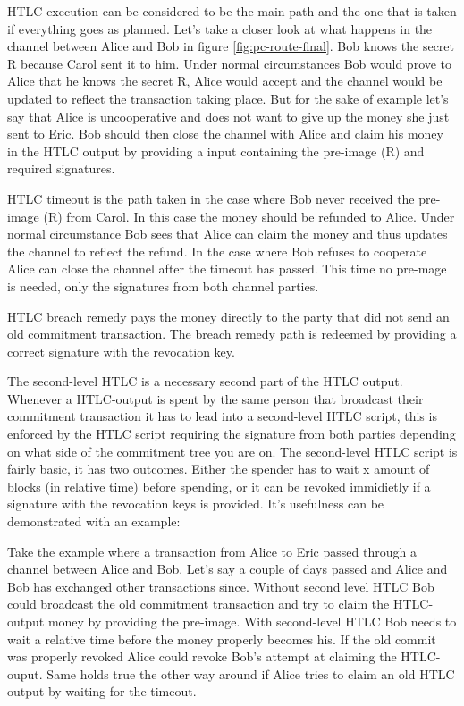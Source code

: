 HTLC execution can be considered to be the main path and the one that is taken if everything goes as planned. Let's take a closer look at what happens in the channel between Alice and Bob in figure \ref{fig:pc-route-final}. Bob knows the secret R because Carol sent it to him. Under normal circumstances Bob would prove to Alice that he knows the secret R, Alice would accept and the channel would be updated to reflect the transaction taking place. But for the sake of example let's say that Alice is uncooperative and does not want to give up the money she just sent to Eric. 
Bob should then close the channel with Alice and claim his money in the HTLC output by providing a input containing the pre-image (R) and required signatures.

HTLC timeout is the path taken in the case where Bob never received the pre-image (R) from Carol. In this case the money should be refunded to Alice. Under normal circumstance Bob sees that Alice can claim the money and thus updates the channel to reflect the refund. In the case where Bob refuses to cooperate Alice can close the channel after the timeout has passed. This time no pre-mage is needed, only the signatures from both channel parties.

HTLC breach remedy pays the money directly to the party that did not send an old commitment transaction. The breach remedy path is redeemed by providing a correct signature with the revocation key.

The second-level HTLC is a necessary second part of the HTLC output. Whenever a HTLC-output is spent by the same person that broadcast their commitment transaction it has to lead into a second-level HTLC script, this is enforced by the HTLC script requiring the signature from both parties depending on what side of the commitment tree you are on. The second-level HTLC script is fairly basic, it has two outcomes. Either the spender has to wait x amount of blocks (in relative time) before spending, or it can be revoked immidietly if a signature with the revocation keys is provided. It's usefulness can be demonstrated with an example:

Take the example where a transaction from Alice to Eric passed through a channel between Alice and Bob. Let's say a couple of days passed and Alice and Bob has exchanged other transactions since. Without second level HTLC Bob could broadcast the old commitment transaction and try to claim the HTLC-output money by providing the pre-image. With second-level HTLC Bob needs to wait a relative time before the money properly becomes his. If the old commit was properly revoked Alice could revoke Bob's attempt at claiming the HTLC-ouput. Same holds true the other way around if Alice tries to claim an old HTLC output by waiting for the timeout.

